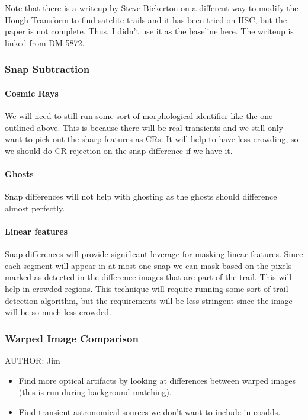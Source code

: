 \begin{note}
Note that there is a writeup by Steve Bickerton on a different way to modify the Hough Transform to find satelite trails and it has been tried on HSC, but the paper is not complete.  Thus, I didn't use it as the baseline here.  The writeup is linked from DM-5872.
\end{note}

\subsubsection{Snap Subtraction}
\label{sec:acSnapSubtraction}
\paragraph{Cosmic Rays}
We will need to still run some sort of morphological identifier like the one outlined above.  This is because there will be real transients and we still only want to pick out the sharp features as CRs.  It will help to have less crowding, so we should do CR rejection on the snap difference if we have it.

\paragraph{Ghosts}
Snap differences will not help with ghosting as the ghosts should difference almost perfectly.

\paragraph{Linear features}
Snap differences will provide significant leverage for masking linear features.  Since each segment will appear in at most one snap we can mask based on the pixels marked as detected in the difference images that are part of the trail.  This will help in crowded regions.  This technique will require running some sort of trail detection algorithm, but the requirements will be less stringent since the image will be so much less crowded.

\subsubsection{Warped Image Comparison}
\label{sec:acWarpedImageArtifactDetection}
AUTHOR: Jim
\begin{itemize}
\item Find more optical artifacts by looking at differences between warped images (this is run during background matching).
\item Find transient astronomical sources we don't want to include in coadds.
\end{itemize}

